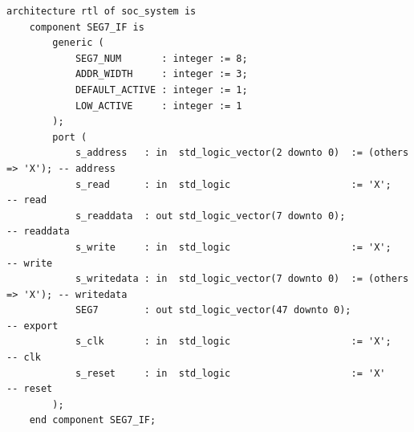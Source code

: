 \documentclass[conference]{IEEEtran}
\begin{document}
\begin{lstlisting}
architecture rtl of soc_system is
	component SEG7_IF is
		generic (
			SEG7_NUM       : integer := 8;
			ADDR_WIDTH     : integer := 3;
			DEFAULT_ACTIVE : integer := 1;
			LOW_ACTIVE     : integer := 1
		);
		port (
			s_address   : in  std_logic_vector(2 downto 0)  := (others => 'X'); -- address
			s_read      : in  std_logic                     := 'X';             -- read
			s_readdata  : out std_logic_vector(7 downto 0);                     -- readdata
			s_write     : in  std_logic                     := 'X';             -- write
			s_writedata : in  std_logic_vector(7 downto 0)  := (others => 'X'); -- writedata
			SEG7        : out std_logic_vector(47 downto 0);                    -- export
			s_clk       : in  std_logic                     := 'X';             -- clk
			s_reset     : in  std_logic                     := 'X'              -- reset
		);
	end component SEG7_IF;


\end{lstlisting}
\end{document}
